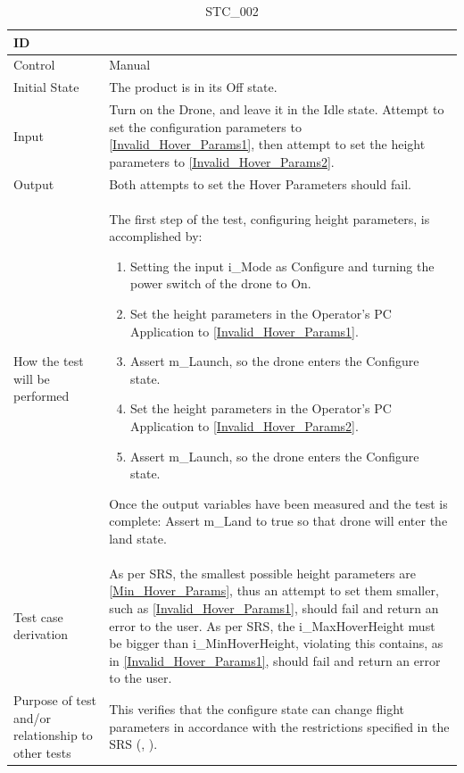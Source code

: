 \documentclass[12pt, titlepage]{article}
\begin{document}
\begin{table}[!h]
\begin{center}
\caption {STC\_002}
\label{tab:STC_002}
\begin{tabular}{ | m{1.5cm} | m{15cm} | } 
\hline
ID & \nameref{tab:STC_002} \\ 
\hline
Control & Manual \\ 
\hline
Initial State & The product is in its Off state. \\ 
\hline
Input & Turn on the Drone, and leave it in the Idle state. Attempt to set the configuration parameters to \ref{Invalid_Hover_Params1}, then attempt to set the height parameters to \ref{Invalid_Hover_Params2}.  \\
\hline
Output & Both attempts to set the Hover Parameters should fail. \\ 
\hline
How the test will be performed & 
The first step of the test, configuring height parameters, is accomplished by:
\begin{enumerate}[topsep=0pt,itemsep=-1ex,partopsep=1ex,parsep=1ex]
    \item Setting the input i\_Mode as Configure and turning the power switch of the drone to On.
    \item Set the height parameters in the Operator's PC Application to \ref{Invalid_Hover_Params1}.
    \item Assert m\_Launch, so the drone enters the Configure state.
    \item Set the height parameters in the Operator's PC Application to \ref{Invalid_Hover_Params2}.
    \item Assert m\_Launch, so the drone enters the Configure state.
\end{enumerate}
Once the output variables have been measured and the test is complete:
Assert m\_Land to true so that drone will enter the land state.\\ 
\hline
Test case derivation & As per SRS, the smallest possible height parameters are \ref{Min_Hover_Params}, thus an attempt to set them smaller, such as \ref{Invalid_Hover_Params1}, should fail and return an error to the user. 
As per SRS, the i\_MaxHoverHeight must be bigger than i\_MinHoverHeight, violating this contains, as in  \ref{Invalid_Hover_Params1}, should fail and return an error to the user.
\\ 
\hline
Purpose of test and/or relationship to other tests & This verifies that the configure state can change flight parameters in accordance with the restrictions specified in the SRS (\nameref{SAFE_002}, \nameref{GEN_004}). \\
\hline
\end{tabular}
\end{center}
\end{table}
\end{document}
